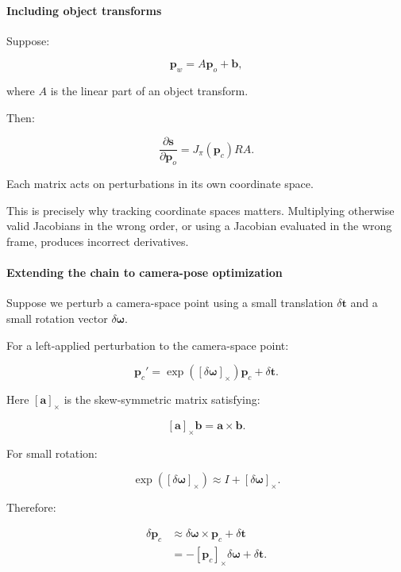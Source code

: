 \paragraph{Including object transforms}\label{02-foundations-ii-ch021-including-object-transforms}

Suppose:

\[
\mathbf p_w=A\mathbf p_o+\mathbf b,
\]

where \(A\) is the linear part of an object transform.

Then:

\[
\boxed{ \frac{\partial\mathbf s}{\partial\mathbf p_o} = J_\pi(\mathbf p_c)RA }.
\]

Each matrix acts on perturbations in its own coordinate space.

This is precisely why tracking coordinate spaces matters. Multiplying otherwise valid Jacobians in the wrong order, or using a Jacobian evaluated in the wrong frame, produces incorrect derivatives.

\paragraph{Extending the chain to camera-pose optimization}\label{02-foundations-ii-ch021-extending-the-chain-to-camera-pose-optimization}

Suppose we perturb a camera-space point using a small translation \(\delta\mathbf t\) and a small rotation vector \(\delta\boldsymbol\omega\).

For a left-applied perturbation to the camera-space point:

\[
\mathbf p_c' = \exp([\delta\boldsymbol\omega]_\times)\mathbf p_c +\delta\mathbf t.
\]

Here \([\mathbf a]_\times\) is the skew-symmetric matrix satisfying:

\[
[\mathbf a]_\times\mathbf b=\mathbf a\times\mathbf b.
\]

For small rotation:

\[
\exp([\delta\boldsymbol\omega]_\times) \approx I+[\delta\boldsymbol\omega]_\times.
\]

Therefore:

\[
\begin{aligned} \delta\mathbf p_c &\approx\delta\boldsymbol\omega\times\mathbf p_c +\delta\mathbf t\\ &=-[\mathbf p_c]_\times\delta\boldsymbol\omega +\delta\mathbf t. \end{aligned}
\]

